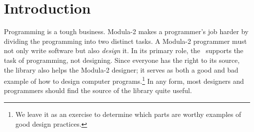 %
%
%
%

\chapter{Introduction}


Programming is a tough business.  Modula-2 makes a programmer's job
harder by dividing the programming into two distinct tasks.
A Modula-2 programmer
must not only write software but also {\em design} it.
In its primary role, the \library\ supports the task of programming,
not designing.  Since everyone has the right to its source, the
library also helps the Modula-2 designer; it serves as both a good
and bad example of how to design computer programs.\footnote{
    We leave it as an exercise to determine which parts are
    worthy examples of good design practices.
    }
In any form, most designers and programmers should find the source
of the library quite useful.

